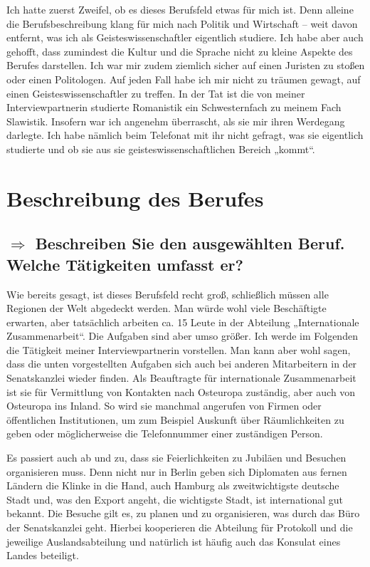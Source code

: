\documentclass[12pt,headsepline,a4paper]{scrartcl}
\newcommand\quest[1]{\subsection*{$\Rightarrow$ #1}}
\begin{document}
Ich hatte zuerst Zweifel, ob es dieses Berufsfeld etwas für mich ist. Denn alleine die Berufsbeschreibung klang für mich nach Politik und Wirtschaft -- weit davon entfernt, was ich als Geisteswissenschaftler eigentlich studiere. Ich habe aber auch gehofft, dass zumindest die Kultur und die Sprache nicht zu kleine Aspekte des Berufes darstellen.
Ich war mir zudem ziemlich sicher auf einen Juristen zu stoßen oder einen Politologen. Auf jeden Fall habe ich mir nicht zu träumen gewagt, auf einen Geisteswissenschaftler zu treffen. In der Tat ist die von meiner Interviewpartnerin studierte Romanistik  ein Schwesternfach zu meinem Fach Slawistik. 
Insofern war ich angenehm überrascht, als sie mir ihren Werdegang darlegte. Ich habe nämlich beim Telefonat mit ihr nicht gefragt, was sie eigentlich studierte und ob sie aus sie geisteswissenschaftlichen Bereich „kommt“.

\section{Beschreibung des Berufes}

\quest{Beschreiben Sie den ausgewählten Beruf. Welche Tätigkeiten umfasst er?}
Wie bereits gesagt, ist dieses Berufsfeld recht groß, schließlich müssen alle Regionen der Welt abgedeckt werden. Man würde wohl viele Beschäftigte erwarten, aber tatsächlich arbeiten ca. 15 Leute  in der Abteilung „Internationale Zusammenarbeit“. Die Aufgaben sind aber umso größer. Ich werde im Folgenden die Tätigkeit meiner Interviewpartnerin vorstellen. Man kann aber wohl sagen, dass die unten vorgestellten Aufgaben sich auch bei anderen Mitarbeitern in der Senatskanzlei wieder finden.
Als Beauftragte für internationale Zusammenarbeit ist sie für Vermittlung von Kontakten nach Osteuropa zuständig, aber auch von Osteuropa ins Inland. So wird sie manchmal angerufen von Firmen oder öffentlichen Institutionen, um zum Beispiel Auskunft über Räumlichkeiten zu geben oder möglicherweise die Telefonnummer einer zuständigen Person.

Es passiert auch ab und zu, dass sie Feierlichkeiten zu Jubiläen und Besuchen organisieren muss. Denn nicht nur in Berlin geben sich Diplomaten aus fernen Ländern die Klinke in die Hand, auch Hamburg als zweitwichtigste deutsche Stadt und, was den Export angeht, die wichtigste Stadt, ist international gut bekannt. Die Besuche gilt es, zu planen und zu organisieren, was durch das Büro der Senatskanzlei geht. Hierbei kooperieren die Abteilung für Protokoll und die jeweilige Auslandsabteilung und natürlich ist häufig auch das Konsulat eines Landes beteiligt.
\end{document}
